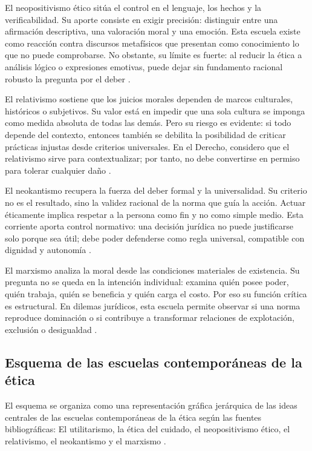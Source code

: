 \documentclass[
	spanish, %
	letterpaper, oneside
]{article}
\begin{document}
El neopositivismo ético sitúa el control en el lenguaje, los hechos y la verificabilidad. Su aporte consiste en exigir precisión: distinguir entre una afirmación descriptiva, una valoración moral y una emoción. Esta escuela existe como reacción contra discursos metafísicos que presentan como conocimiento lo que no puede comprobarse. No obstante, su límite es fuerte: al reducir la ética a análisis lógico o expresiones emotivas, puede dejar sin fundamento racional robusto la pregunta por el deber \citep{singerCompendioEtica1995}.

El relativismo sostiene que los juicios morales dependen de marcos culturales, históricos o subjetivos. Su valor está en impedir que una sola cultura se imponga como medida absoluta de todas las demás. Pero su riesgo es evidente: si todo depende del contexto, entonces también se debilita la posibilidad de criticar prácticas injustas desde criterios universales. En el Derecho, considero que el relativismo sirve para contextualizar; por tanto, no debe convertirse en permiso para tolerar cualquier daño \citep{singerCompendioEtica1995}.

El neokantismo recupera la fuerza del deber formal y la universalidad. Su criterio no es el resultado, sino la validez racional de la norma que guía la acción. Actuar éticamente implica respetar a la persona como fin y no como simple medio. Esta corriente aporta control normativo: una decisión jurídica no puede justificarse solo porque sea útil; debe poder defenderse como regla universal, compatible con dignidad y autonomía \citep{huertaEticaConClasicos2000,ronquilloarmasEticaGeneralProfesional2018}.

El marxismo analiza la moral desde las condiciones materiales de existencia. Su pregunta no se queda en la intención individual: examina quién posee poder, quién trabaja, quién se beneficia y quién carga el costo. Por eso su función crítica es estructural. En dilemas jurídicos, esta escuela permite observar si una norma reproduce dominación o si contribuye a transformar relaciones de explotación, exclusión o desigualdad \citep{huertaEticaConClasicos2000,ronquilloarmasEticaGeneralProfesional2018}.

\subsection{Esquema de las escuelas contemporáneas de la ética}

El esquema se organiza como una representación gráfica jerárquica de las ideas centrales de las escuelas contemporáneas de la ética según las fuentes bibliográficas: El utilitarismo, la ética del cuidado, el neopositivismo ético, el relativismo, el neokantismo y el marxismo \citep{lopezmartinezTecnicasDidacticas2023}.
\end{document}
